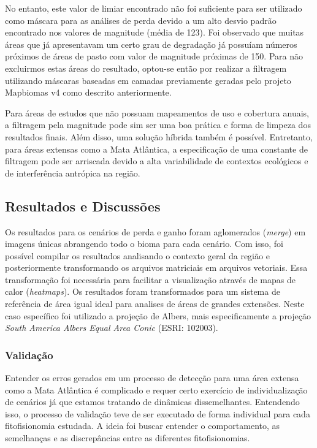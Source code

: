 No entanto, este valor de limiar encontrado não foi suficiente para ser utilizado como máscara para as análises de perda devido a um alto desvio padrão encontrado nos valores de magnitude (média de 123). Foi observado que muitas áreas que já apresentavam um certo grau de degradação já possuíam números próximos de áreas de pasto com valor de magnitude próximas de 150. Para não excluirmos estas áreas do resultado, optou-se então por realizar a filtragem utilizando máscaras baseadas em camadas previamente geradas pelo projeto Mapbiomas v4 como descrito anteriormente.

Para áreas de estudos que não possuam mapeamentos de uso e cobertura anuais, a filtragem pela magnitude pode sim ser uma boa prática e forma de limpeza dos resultados finais. Além disso, uma solução híbrida também é possível. Entretanto, para áreas extensas como a Mata Atlântica, a especificação de uma constante de filtragem pode ser arriscada devido a alta variabilidade de contextos ecológicos e de interferência antrópica na região.

\subsection{Resultados e Discussões}

\hspace{13pt} Os resultados para os cenários de perda e ganho foram aglomerados (\textit{merge}) em imagens únicas abrangendo todo o bioma para cada cenário. Com isso, foi possível compilar os resultados analisando o contexto geral da região e posteriormente transformando os arquivos matriciais em arquivos vetoriais. Essa transformação foi necessária para facilitar a visualização através de mapas de calor (\textit{heatmaps}). Os resultados foram transformados para um sistema de referência de área igual ideal para analises de áreas de grandes extensões. Neste caso específico foi utilizado a projeção de Albers, mais especificamente a projeção \textit{South America Albers Equal Area Conic} (ESRI: 102003). 

\subsubsection{Validação}

\hspace{13pt} Entender os erros gerados em um processo de detecção para uma área extensa como a Mata Atlântica é complicado e requer certo exercício de individualização de cenários já que estamos tratando de dinâmicas dissemelhantes. Entendendo isso, o processo de validação teve de ser executado de forma individual para cada fitofisionomia estudada. A ideia foi buscar entender o comportamento, as semelhanças e as discrepâncias entre as diferentes fitofisionomias.


